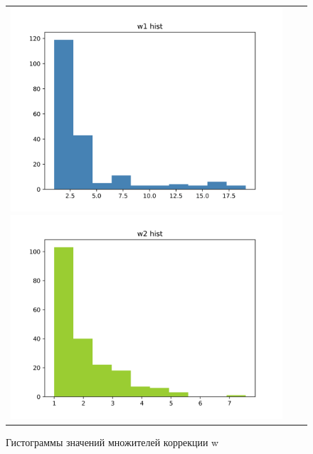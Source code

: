 \begin{figure}[H]
	\begin{tabular}{ccc}
		\includegraphics[scale=0.5]{resources/whyst_PR1.png}
		\includegraphics[scale=0.5]{resources/whyst_PR2.png}
	\end{tabular} \label{pic:whysts}
	\caption{Гистограммы значений множителей коррекции w} 
\end{figure}

